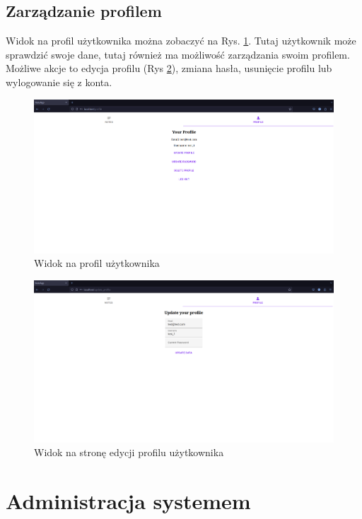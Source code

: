 \documentclass[a4paper,twoside,12pt]{book}
\begin{document}
\subsection{Zarządzanie profilem}
Widok na profil użytkownika można zobaczyć na Rys. \ref{fig:strona-profilu}. 
Tutaj użytkownik może sprawdzić swoje dane, tutaj również ma możliwość
zarządzania swoim profilem. Możliwe akcje to edycja profilu (Rys \ref{fig:strona-edycja-profilu}),
zmiana hasła, usunięcie profilu lub wylogowanie się z konta.

\begin{figure}[H]
\centering
\includegraphics[width=1.0\textwidth]{./images/strona-profilu.png}
\caption{Widok na profil użytkownika}
\label{fig:strona-profilu}
\end{figure}

\begin{figure}[H]
\centering
\includegraphics[width=1.0\textwidth]{./images/strona-edycji-profilu.png}
\caption{Widok na stronę edycji profilu użytkownika}
\label{fig:strona-edycja-profilu}
\end{figure}

\section{Administracja systemem}
\end{document}
